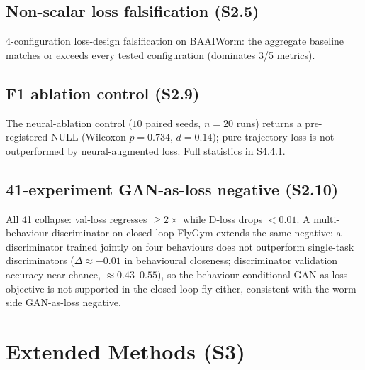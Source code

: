 \documentclass[11pt]{article}
\begin{document}
\subsection{Non-scalar loss falsification (S2.5)}
4-configuration loss-design falsification on BAAIWorm: the aggregate baseline matches or exceeds every tested configuration (dominates 3/5 metrics).

\subsection{F1 ablation control (S2.9)}
The neural-ablation control ($10$ paired seeds, $n{=}20$ runs) returns a pre-registered NULL (Wilcoxon $p{=}0.734$, $d{=}0.14$); pure-trajectory loss is not outperformed by neural-augmented loss. Full statistics in S4.4.1.

\subsection{41-experiment GAN-as-loss negative (S2.10)}
All 41 collapse: val-loss regresses $\geq 2\times$ while D-loss drops $<0.01$. A multi-behaviour discriminator on closed-loop FlyGym extends the same negative: a discriminator trained jointly on four behaviours does not outperform single-task discriminators ($\Delta{\approx}-0.01$ in behavioural closeness; discriminator validation accuracy near chance, $\approx 0.43$--$0.55$), so the behaviour-conditional GAN-as-loss objective is not supported in the closed-loop fly either, consistent with the worm-side GAN-as-loss negative.

\section{Extended Methods (S3)}
\label{si:methods}
\end{document}
